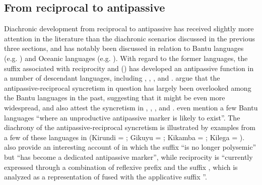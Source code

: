 \subsection{From reciprocal to antipassive} \label{diachrony:recp2antp}
Diachronic development from reciprocal to antipassive has received slightly more attention in the literature than the diachronic scenarios discussed in the previous three sections, and has notably been discussed in relation to Bantu languages (e.g. \citealt{bostoen:al:2015}) and Oceanic languages (e.g. \citealt{janic:2016}). With regard to the former languages, the  suffix  associated with reciprocity and  () has developed an antipassive function in a number of descendant languages, including  \citep[272ff.]{ndayiragije:2006}, ,  \citep[297f.]{nedjalkov:2007d}, and  \citep[755]{creissels:2018}. \cite[731f., 738ff.]{bostoen:al:2015} argue that the antipassive-reciprocal syncretism in question has largely been overlooked among the Bantu languages in the past, suggesting that it might be even more widespread, and also attest the syncretism in , , , and . \cite[742ff.]{bostoen:al:2015} even mention a few Bantu languages “where an unproductive antipassive marker is likely to exist”. The diachrony of the antipassive-reciprocal syncretism is illustrated by examples from a few of these languages in  (Kirundi = \citealt[275]{ndayiragije:2006}; Gikuyu = \citealt[163f.]{mugane:1999}; Kikamba = \citealt[39]{kioko:2005}; Kilega = \citealt[136f.]{botne:2003}). \cite[741]{bostoen:al:2015} also provide an interesting account of  in which the suffix  “is no longer polysemic” but “has become a dedicated antipassive marker”, while reciprocity is “currently expressed through a combination of reflexive prefix  and the suffix , which is analyzed as a representation of  fused with the applicative suffix ”.

